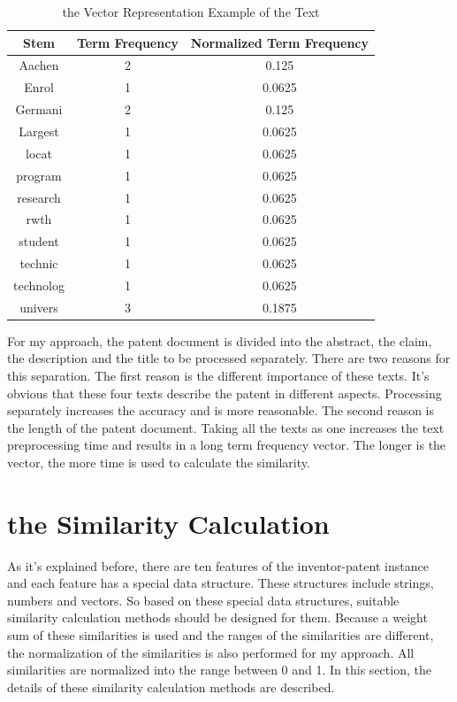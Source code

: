 \begin{table}

\begin{center}
\begin{tabular}{ | c | c | c |}
\hline
  Stem  & Term Frequency & Normalized Term Frequency \\ \hline
  Aachen & 2 & 0.125 \\ \hline
  Enrol & 1 & 0.0625\\ \hline
  Germani & 2 &  0.125\\ \hline
  Largest & 1& 0.0625\\ \hline
  locat & 1 &0.0625\\ \hline
  program & 1&0.0625\\ \hline
  research & 1& 0.0625\\ \hline
  rwth & 1 &0.0625\\ \hline
  student & 1 &0.0625\\ \hline
  technic & 1 &0.0625\\ \hline
  technolog & 1 &0.0625\\ \hline
  univers & 3 & 0.1875\\ 
  \hline
\end{tabular}
\end{center}
\caption{the Vector Representation Example of the Text}
\end{table}

For my approach, the patent document is divided into the abstract, the claim, the description and the title to be processed separately. There are two reasons for this separation. The first reason is the different importance of these texts. It's obvious that these four texts describe the patent in different aspects. Processing separately increases the accuracy and is more reasonable. The second reason is the length of the patent document. Taking all the texts as one increases the text preprocessing time and results in a long term frequency vector. The longer is the vector, the more time is used to calculate the similarity. 

\section{the Similarity Calculation}
As it's explained before, there are ten features of the inventor-patent instance and each feature has a special data structure. These structures include strings, numbers and vectors. So based on these special data structures, suitable similarity calculation methods should  be designed for them. Because a weight sum of these similarities is used and the ranges of the similarities are different, the normalization of the similarities is also performed for my approach. All similarities are normalized into the range between 0 and 1. In this section, the details of these similarity calculation methods are described.


